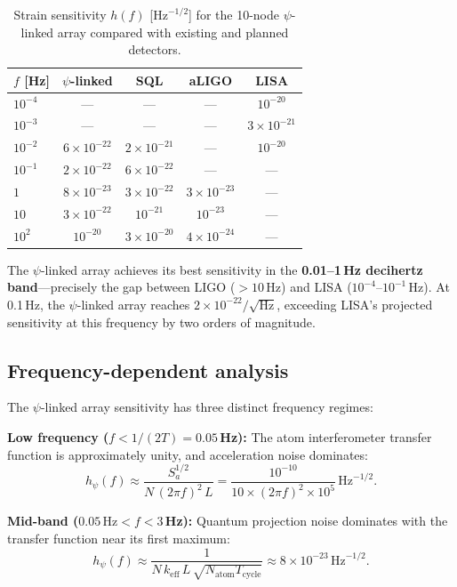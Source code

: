 \documentclass[aps,prl,twocolumn,superscriptaddress,showpacs]{revtex4-2}
\theoremstyle{definition}
\begin{document}
\begin{table}[h]
\caption{Strain sensitivity $h(f)$ [$\mathrm{Hz}^{-1/2}$] for
the 10-node $\psi$-linked array compared with existing and planned
detectors.}
\label{tab:sensitivity}
\begin{ruledtabular}
\begin{tabular}{lcccc}
$f$ [Hz] & $\psi$-linked & SQL & aLIGO & LISA \\
\hline
$10^{-4}$ & --- & --- & --- & $10^{-20}$ \\
$10^{-3}$ & --- & --- & --- & $3\times 10^{-21}$ \\
$10^{-2}$ & $6\times 10^{-22}$ & $2\times 10^{-21}$ & --- & $10^{-20}$ \\
$10^{-1}$ & $2\times 10^{-22}$ & $6\times 10^{-22}$ & --- & --- \\
$1$ & $8\times 10^{-23}$ & $3\times 10^{-22}$ & $3\times 10^{-23}$ & --- \\
$10$ & $3\times 10^{-22}$ & $10^{-21}$ & $10^{-23}$ & --- \\
$10^2$ & $10^{-20}$ & $3\times 10^{-20}$ & $4\times 10^{-24}$ & --- \\
\end{tabular}
\end{ruledtabular}
\end{table}

The $\psi$-linked array achieves its best sensitivity in the
\textbf{0.01--1\,Hz decihertz band}---precisely the gap between
LIGO ($>10$\,Hz) and LISA ($10^{-4}$--$10^{-1}$\,Hz). At 0.1\,Hz,
the $\psi$-linked array reaches $2\times 10^{-22}/\sqrt{\mathrm{Hz}}$,
exceeding LISA's projected sensitivity at this frequency by two
orders of magnitude.

\subsection{Frequency-dependent analysis}

The $\psi$-linked array sensitivity has three distinct frequency regimes:

\textbf{Low frequency ($f < 1/(2T) = 0.05$\,Hz):}
The atom interferometer transfer function is approximately unity,
and acceleration noise dominates:
\begin{equation}
h_\psi(f) \approx \frac{S_a^{1/2}}{N\,(2\pi f)^2\,L}
= \frac{10^{-10}}{10\times (2\pi f)^2 \times 10^5}\,\mathrm{Hz}^{-1/2}.
\label{eq:low-freq}
\end{equation}

\textbf{Mid-band ($0.05\,\text{Hz} < f < 3$\,Hz):}
Quantum projection noise dominates with the transfer function near
its first maximum:
\begin{equation}
h_\psi(f) \approx \frac{1}{N\,k_{\mathrm{eff}}\,L\,\sqrt{N_{\mathrm{atom}}
T_{\mathrm{cycle}}}}
\approx 8\times 10^{-23}\,\mathrm{Hz}^{-1/2}.
\label{eq:mid-freq}
\end{equation}
\end{document}
